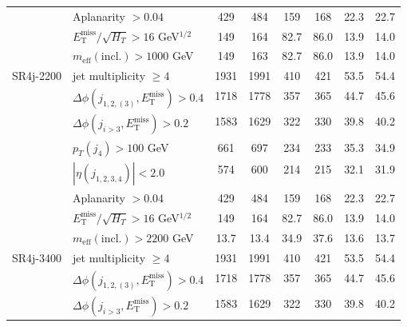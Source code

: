\documentclass[10pt,fleqn]{article}
\newcommand{\met}{E^\mathrm{miss}_\mathrm{T}}
\newcommand{\meff}{m_\mathrm{eff}}
\begin{document}
\begin{table}[H]
\begin{tabular}{c|l|c|c|c|c|c|c}
             & Aplanarity $> 0.04$                             &      429   &    484    &  159       &   168     &      22.3    &   22.7         \\           
             & $\met/\sqrt{H_T} > 16$ GeV$^{1/2}$              &      149   &    164    &  82.7      &   86.0    &      13.9    &   14.0         \\    
             & $\meff(\mathrm{incl.}) > 1000$ GeV              &      149   &    163    &  82.7      &   86.0    &      13.9    &   14.0         \\ \midrule                 
SR4j-2200    & jet multiplicity $\geq 4$                       &     1931   &   1991    &  410       &   421     &      53.5    &   54.4         \\
             & $\Delta\phi(j_{1,2,(3)},\met) > 0.4$            &     1718   &   1778    &  357       &   365     &      44.7    &   45.6         \\
             & $\Delta\phi(j_{i>3},\met) > 0.2$                &     1583   &   1629    &  322       &   330     &      39.8    &   40.2         \\
             & $p_T(j_4) > 100$ GeV                            &      661   &    697    &  234       &   233     &      35.3    &   34.9         \\      
             & $|\eta(j_{1,2,3,4})|< 2.0$                      &      574   &    600    &  214       &   215     &      32.1    &   31.9         \\           
             & Aplanarity $> 0.04$                             &      429   &    484    &  159       &   168     &      22.3    &   22.7         \\           
             & $\met/\sqrt{H_T} > 16$ GeV$^{1/2}$              &      149   &    164    &  82.7      &   86.0    &      13.9    &   14.0         \\    
             & $\meff(\mathrm{incl.}) > 2200$ GeV              &     13.7   &   13.4    &  34.9      &   37.6    &      13.6    &   13.7         \\ \midrule             
SR4j-3400    & jet multiplicity $\geq 4$                       &     1931   &   1991    &  410       &   421     &      53.5    &   54.4         \\
             & $\Delta\phi(j_{1,2,(3)},\met) > 0.4$            &     1718   &   1778    &  357       &   365     &      44.7    &   45.6         \\
             & $\Delta\phi(j_{i>3},\met) > 0.2$                &     1583   &   1629    &  322       &   330     &      39.8    &   40.2         \\

\end{tabular}
\end{table}
\end{document}

